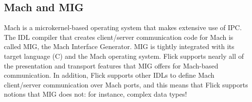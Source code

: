 





\subsection{Mach and MIG}
\label{subsec:Mach and MIG}

Mach is a microkernel-based operating system that makes extensive use of IPC\@.
The IDL compiler that creates client/server communication code for Mach is
called MIG, the Mach Interface Generator.  MIG is tightly integrated with its
target language (C) and the Mach operating system.  Flick supports nearly all
of the presentation and transport features that MIG offers for Mach-based
communication.  In addition, Flick supports other IDLs to define Mach
client/server communication over Mach ports, and this means that Flick supports
notions that MIG does not: for instance, complex data types!






